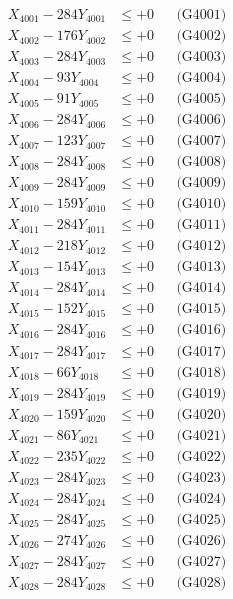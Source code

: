 \documentclass[a4paper,10pt]{article}
\begin{document}
{\begin{align}
\allowbreak
X_{4001} - 284Y_{4001} &\leq +0 && \text{(G4001)} \\
X_{4002} - 176Y_{4002} &\leq +0 && \text{(G4002)} \\
X_{4003} - 284Y_{4003} &\leq +0 && \text{(G4003)} \\
X_{4004} - 93Y_{4004} &\leq +0 && \text{(G4004)} \\
X_{4005} - 91Y_{4005} &\leq +0 && \text{(G4005)} \\
X_{4006} - 284Y_{4006} &\leq +0 && \text{(G4006)} \\
X_{4007} - 123Y_{4007} &\leq +0 && \text{(G4007)} \\
X_{4008} - 284Y_{4008} &\leq +0 && \text{(G4008)} \\
X_{4009} - 284Y_{4009} &\leq +0 && \text{(G4009)} \\
X_{4010} - 159Y_{4010} &\leq +0 && \text{(G4010)} \\
\allowbreak
X_{4011} - 284Y_{4011} &\leq +0 && \text{(G4011)} \\
X_{4012} - 218Y_{4012} &\leq +0 && \text{(G4012)} \\
X_{4013} - 154Y_{4013} &\leq +0 && \text{(G4013)} \\
X_{4014} - 284Y_{4014} &\leq +0 && \text{(G4014)} \\
X_{4015} - 152Y_{4015} &\leq +0 && \text{(G4015)} \\
X_{4016} - 284Y_{4016} &\leq +0 && \text{(G4016)} \\
X_{4017} - 284Y_{4017} &\leq +0 && \text{(G4017)} \\
X_{4018} - 66Y_{4018} &\leq +0 && \text{(G4018)} \\
X_{4019} - 284Y_{4019} &\leq +0 && \text{(G4019)} \\
X_{4020} - 159Y_{4020} &\leq +0 && \text{(G4020)} \\
\allowbreak
X_{4021} - 86Y_{4021} &\leq +0 && \text{(G4021)} \\
X_{4022} - 235Y_{4022} &\leq +0 && \text{(G4022)} \\
X_{4023} - 284Y_{4023} &\leq +0 && \text{(G4023)} \\
X_{4024} - 284Y_{4024} &\leq +0 && \text{(G4024)} \\
X_{4025} - 284Y_{4025} &\leq +0 && \text{(G4025)} \\
X_{4026} - 274Y_{4026} &\leq +0 && \text{(G4026)} \\
X_{4027} - 284Y_{4027} &\leq +0 && \text{(G4027)} \\
X_{4028} - 284Y_{4028} &\leq +0 && \text{(G4028)} \\

\end{align}}
\end{document}
